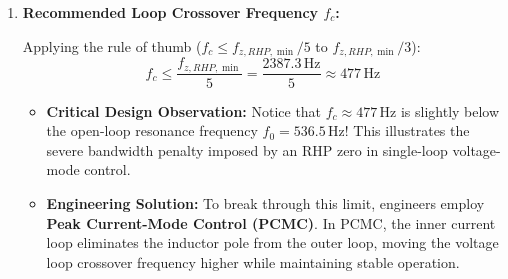 \begin{enumerate}
  \item \textbf{Recommended Loop Crossover Frequency $f_c$:} \par
  Applying the rule of thumb ($f_c \le f_{z,RHP,\min} / 5$ to $f_{z,RHP,\min} / 3$):
  \begin{equation}
  \boxed{f_c \le \frac{f_{z,RHP,\min}}{5} = \frac{2387.3\,\si{\hertz}}{5} \approx 477\,\si{\hertz}}
  \end{equation}
  \begin{itemize}
    \item \textbf{Critical Design Observation:} Notice that $f_c \approx 477\,\si{\hertz}$ is slightly below the open-loop resonance frequency $f_0 = 536.5\,\si{\hertz}$! This illustrates the severe bandwidth penalty imposed by an RHP zero in single-loop voltage-mode control.
    \item \textbf{Engineering Solution:} To break through this limit, engineers employ \textbf{Peak Current-Mode Control (PCMC)}. In PCMC, the inner current loop eliminates the inductor pole from the outer loop, moving the voltage loop crossover frequency higher while maintaining stable operation.
  \end{itemize}
\end{enumerate}

